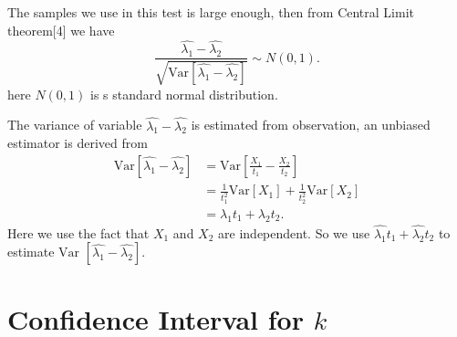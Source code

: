 \documentclass[11pt,a4paper,english]{article}
\begin{document}
The samples we use in this test is large enough, then from Central Limit theorem[4] we have
\begin{equation*}
	\frac{\hat{\lambda_{1}} - \hat{\lambda_{2}}}{\sqrt{\text{Var}\left[\hat{\lambda_{1}} - \hat{\lambda_{2}}\right]}}
	\sim N(0, 1).
\end{equation*}
here $N(0,1)$ is s standard normal distribution.

The variance of variable $\hat{\lambda_{1}}-\hat{\lambda_{2}}$ is estimated from observation, an unbiased estimator is derived from
\begin{align*}
	\text{Var}\left[\hat{\lambda_{1}} - \hat{\lambda_{2}}\right]
	&= \text{Var}\left[\frac{X_{1}}{t_{1}} - \frac{X_{2}}{t_{2}}\right] \\
	&= \frac{1}{t_{1}^{2}}\text{Var}[X_{1}]
	+ \frac{1}{t_{2}^{2}}\text{Var}[X_{2}] \\
	&= \lambda_{1} t_{1} + \lambda_{2} t_{2}.
\end{align*}
Here we use the fact that $X_{1}$ and $X_{2}$ are independent. So we use $\hat{\lambda_{1}}t_{1}+\hat{\lambda_{2}}t_{2}$ to estimate $\text{Var }\left[\hat{\lambda_{1}}-\hat{\lambda_{2}}\right]$.

\section{Confidence Interval for $k$}
\end{document}

